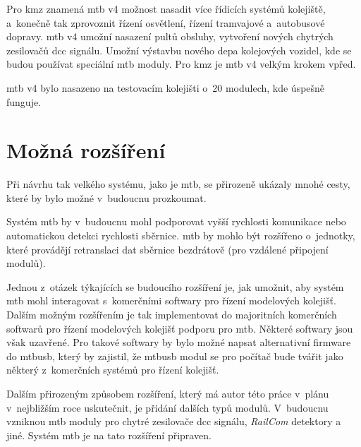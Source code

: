 Pro \gls{kmz} znamená \gls{mtb} v4 možnost nasadit více řídicích systémů
kolejiště, a~konečně tak zprovoznit řízení osvětlení, řízení tramvajové
a~autobusové dopravy. \gls{mtb} v4 umožní nasazení pultů obsluhy,
vytvoření nových chytrých zesilovačů \gls{dcc} signálu. Umožní výstavbu nového
depa kolejových vozidel, kde se budou používat speciální \gls{mtb} moduly.
Pro \gls{kmz} je \gls{mtb} v4 velkým krokem vpřed.

\gls{mtb} v4 bylo nasazeno na testovacím kolejišti o~20 modulech, kde úspešně
funguje.

\section{Možná rozšíření} \label{sec:future}

Při návrhu tak velkého systému, jako je \gls{mtb}, se přirozeně ukázaly mnohé
cesty, které by bylo možné v~budoucnu prozkoumat.

Systém \gls{mtb} by v~budoucnu mohl podporovat vyšší rychlosti komunikace nebo
automatickou detekci rychlosti sběrnice. \gls{mtb} by mohlo být rozšířeno
o~jednotky, které provádějí retranslaci dat sběrnice bezdrátově (pro vzdálené
připojení modulů).

Jednou z~otázek týkajících se budoucího rozšíření je, jak umožnit, aby systém
\gls{mtb} mohl interagovat s~komerčními softwary pro řízení modelových
kolejišť.
Dalším možným rozšířením je tak implementovat do majoritních komerčních
softwarů pro řízení modelových kolejišť podporu pro \gls{mtb}. Některé softwary
jsou však uzavřené. Pro takové softwary by bylo možné napsat alternativní
firmware do \gls{mtbusb}, který by zajistil, že \gls{mtbusb} modul se pro
počítač bude tvářit jako některý z~komerčních systémů pro řízení kolejišť.

Dalším přirozeným způsobem rozšíření, který má autor této práce v~plánu
v~nejbližším roce uskutečnit, je přidání dalších typů modulů. V~budoucnu
vzniknou \gls{mtb} moduly pro chytré zesilovače \gls{dcc} signálu,
\textit{RailCom} detektory a jiné. Systém \gls{mtb} je na tato rozšíření
připraven.
